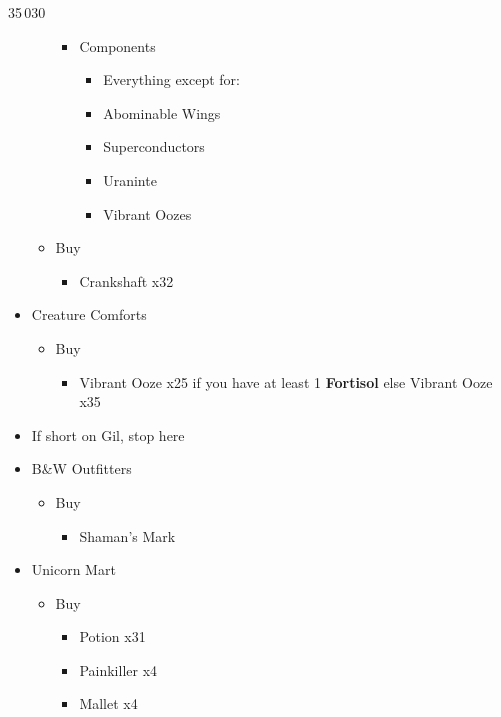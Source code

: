 \begin{paracol}{2}
\begin{shop}{35\,030}
\begin{itemize}
\begin{itemize}
\begin{itemize}
\begin{itemize}
					                  \end{itemize}
					            \item Components
					                  \begin{itemize}
						                  \item Everything except for:
						                  \item Abominable Wings
						                  \item Superconductors
						                  \item Uraninte
						                  \item Vibrant Oozes
					                  \end{itemize}
				            \end{itemize}
				      \item Buy
				            \begin{itemize}
					            \item Crankshaft x32
				            \end{itemize}
			      \end{itemize}
			\item Creature Comforts
			      \begin{itemize}
				      \item Buy
				            \begin{itemize}
					            \item Vibrant Ooze x25 if you have at least 1 \textbf{Fortisol} else Vibrant Ooze x35
				            \end{itemize}
			      \end{itemize}
			\item If short on Gil, stop here
			\item B\&W Outfitters
			      \begin{itemize}
				      \item Buy
				            \begin{itemize}
					            \item Shaman's Mark
				            \end{itemize}
			      \end{itemize}
			\item Unicorn Mart
			      \begin{itemize}
				      \item Buy
				            \begin{itemize}
					            \item Potion x31
					            \item Painkiller x4
					            \item Mallet x4
				            \end{itemize}
			      \end{itemize}
		\end{itemize}
	\end{shop}


\end{paracol}
